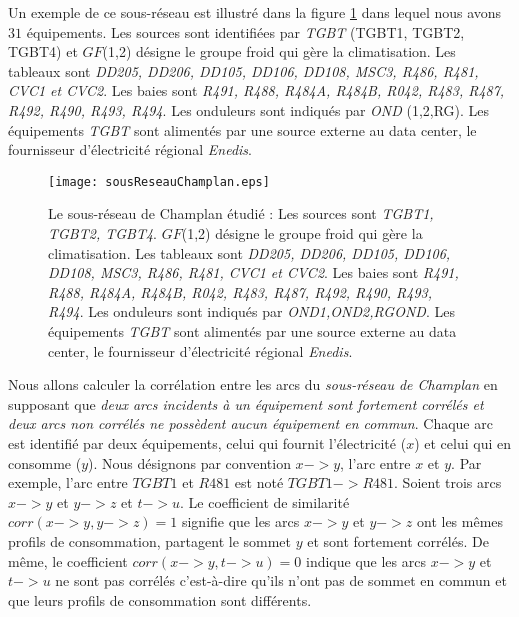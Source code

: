Un exemple de ce sous-r\'eseau est illustr\'e dans la figure \ref{sousReseauChamplan} dans lequel nous avons $31$ \'equipements. Les sources sont identifi\'ees par {\em TGBT} (TGBT1, TGBT2, TGBT4) et $GF$(1,2) d\'esigne le groupe froid qui g\`ere la climatisation. Les tableaux sont {\em DD205, DD206, DD105, DD106, DD108, MSC3, R486, R481, CVC1 et CVC2}. Les baies sont {\em R491, R488, R484A, R484B, R042, R483, R487, R492, R490, R493, R494}. Les onduleurs sont indiqu\'es par {\em OND} (1,2,RG). Les \'equipements {\em TGBT} sont aliment\'es par une source externe au data center, le fournisseur d'\'electricit\'e r\'egional {\em Enedis}.  
\begin{figure}[htb!] 
\centering
\texttt{[image: sousReseauChamplan.eps]}
\caption{Le sous-r\'eseau de Champlan \'etudi\'e : Les sources sont {\em TGBT1, TGBT2, TGBT4}. $GF$(1,2) d\'esigne le groupe froid qui g\`ere la climatisation. 
Les tableaux sont {\em DD205, DD206, DD105, DD106, DD108, MSC3, R486, R481, CVC1 et CVC2}. 
Les baies sont {\em R491, R488, R484A, R484B, R042, R483, R487, R492, R490, R493, R494}. Les onduleurs sont indiqu\'es par {\em OND1,OND2,RGOND}. 
Les \'equipements {\em TGBT} sont aliment\'es par une source externe au data center, le fournisseur d'\'electricit\'e r\'egional {\em Enedis}.
}
\label{sousReseauChamplan}
\end{figure}
\newline

Nous allons calculer la corr\'elation entre les arcs du {\em sous-r\'eseau de Champlan} en supposant que {\em deux arcs incidents \`a un \'equipement sont fortement corr\'el\'es et deux arcs non corr\'el\'es ne poss\`edent aucun \'equipement en commun}.
Chaque arc est identifi\'e par deux \'equipements, celui qui fournit l'\'electricit\'e ($x$) et celui qui en consomme ($y$). Nous d\'esignons par convention $x->y$, l'arc entre $x$ et $y$. Par exemple, l'arc entre $TGBT1$ et $R481$ est not\'e $TGBT1->R481$. 
\newline
Soient trois arcs $x->y$ et $y->z$ et $t->u$. 
Le coefficient de similarit\'e $corr(x->y,y->z) = 1$ signifie que les arcs $x->y$ et $y->z$  ont les m\^emes profils de consommation, partagent le sommet $y$ et sont fortement corr\'el\'es. De m\^eme, le coefficient $corr(x->y,t->u) = 0$ indique que les arcs  $x->y$ et $t->u$ ne sont pas corr\'el\'es c'est-\`a-dire qu'ils n'ont pas de sommet en commun et que leurs profils de consommation sont diff\'erents.
\newline

